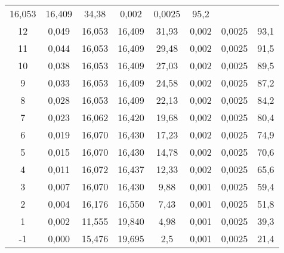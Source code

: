 \begin{table}[H]
{\begin{tabular}{cccccccc}
      16,053 &
      16,409 &
      34,38 &
      0,002 &
      0,0025 &
      95,2
      \\
    12 &
      0,049 &
      16,053 &
      16,409 &
      31,93 &
      0,002 &
      0,0025 &
      93,1
      \\
    11 &
      0,044 &
      16,053 &
      16,409 &
      29,48 &
      0,002 &
      0,0025 &
      91,5
      \\
    10 &
      0,038 &
      16,053 &
      16,409 &
      27,03 &
      0,002 &
      0,0025 &
      89,5
      \\
    9 &
      0,033 &
      16,053 &
      16,409 &
      24,58 &
      0,002 &
      0,0025 &
      87,2
      \\
    8 &
      0,028 &
      16,053 &
      16,409 &
      22,13 &
      0,002 &
      0,0025 &
      84,2
      \\
    7 &
      0,023 &
      16,062 &
      16,420 &
      19,68 &
      0,002 &
      0,0025 &
      80,4
      \\
    6 &
      0,019 &
      16,070 &
      16,430 &
      17,23 &
      0,002 &
      0,0025 &
      74,9
      \\
    5 &
      0,015 &
      16,070 &
      16,430 &
      14,78 &
      0,002 &
      0,0025 &
      70,6
      \\
    4 &
      0,011 &
      16,072 &
      16,437 &
      12,33 &
      0,002 &
      0,0025 &
      65,6
      \\
    3 &
      0,007 &
      16,070 &
      16,430 &
      9,88 &
      0,001 &
      0,0025 &
      59,4
      \\
    2 &
      0,004 &
      16,176 &
      16,550 &
      7,43 &
      0,001 &
      0,0025 &
      51,8
      \\
    1 &
      0,002 &
      11,555 &
      19,840 &
      4,98 &
      0,001 &
      0,0025 &
      39,3
      \\
    -1 &
      0,000 &
      15,476 &
      19,695 &
      2,5 &
      0,001 &
      0,0025 &
      21,4
      \bigstrut[b]\\
    \hline
  \end{tabular}}
  \label{sxCMD}
\end{table}

